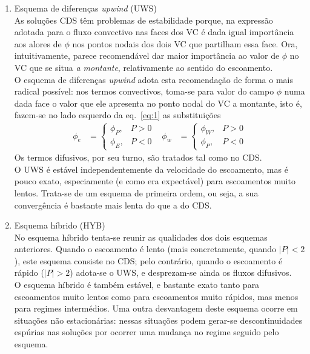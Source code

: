 \documentclass[11pt,twoside]{article}
\begin{document}
{\begin{enumerate}
\item Esquema de diferenças \emph{upwind} (UWS)\\
As soluções CDS têm problemas de estabilidade porque, na expressão adotada para
o fluxo convectivo nas faces dos VC é dada igual importância aos  alores de
$\phi$ nos pontos nodais dos dois VC que partilham essa face. Ora,
intuitivamente, parece recomendável dar maior importância ao valor de $\phi$ no
VC que se situa \emph{a montante}, relativamente ao sentido do escoamento.\\
%
O esquema de diferenças \emph{upwind} adota esta recomendação de forma o mais
radical possível: nos termos convectivos, toma-se para valor do campo $\phi$
numa dada face o valor que ele apresenta no ponto nodal do VC a montante, isto
é, fazem-se no lado esquerdo da eq.~\eqref{eq:1} as substituições
\begin{align}
    \phi_e&=
    \begin{cases}
        \phi_P,&P>0\\
        \phi_E,&P<0
    \end{cases}&
    \phi_w&=
    \begin{cases}
        \phi_W,&P>0\\
        \phi_P,&P<0
    \end{cases}
\end{align}
Os termos difusivos, por seu turno, são tratados tal como no CDS.\\
%
O UWS é estável independentemente da velocidade do escoamento, mas é pouco
exato, especiamente (e como era expectável) para escoamentos muito lentos.
Trata-se de um esquema de primeira ordem, ou seja, a sua convergência é bastante
mais lenta do que a do CDS.

\item {Esquema híbrido (HYB)}\\
No esquema híbrido tenta-se reunir as qualidades dos dois esquemas anteriores.
Quando o escoamento é lento (mais concretamente, quando $|P|<2$), este esquema
consiste no CDS; pelo contrário, quando o escoamento é rápido ($|P|>2$) adota-se
o UWS, e desprezam-se ainda os fluxos difusivos.\\
%
O esquema híbrido é também estável, e bastante exato tanto para escoamentos
muito lentos como para escoamentos muito rápidos, mas menos para regimes
intermédios. Uma outra desvantagem deste esquema ocorre em situações não
estacionárias: nessas situações podem gerar-se descontinuidades espúrias nas
soluções por ocorrer uma mudança no regime seguido pelo esquema.
\end{enumerate}

}
\end{document}
